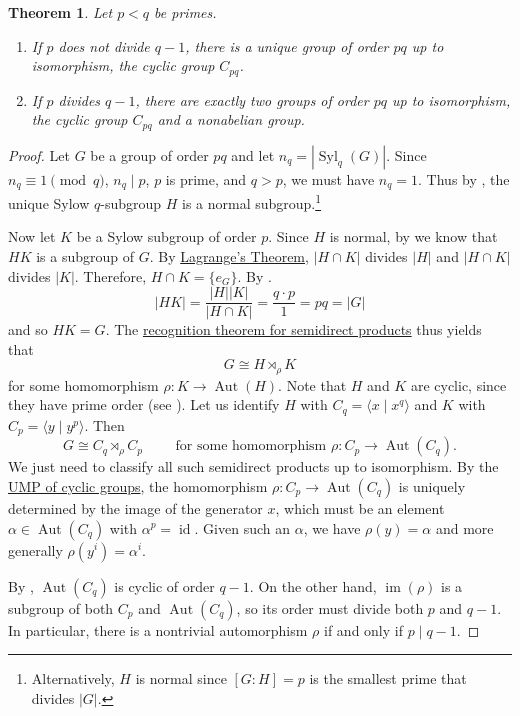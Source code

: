\documentclass[12pt]{report}
\newtheorem{theorem}{Theorem}[chapter]
\numberwithin{equation}{section}
\numberwithin{theorem}{chapter}
\theoremstyle{definition}
\newtheorem*{basic properties}{Basic Properties}
\newtheorem*{Important Remark}{Important Remark}
\def\sdp{\rtimes}
\DeclareMathOperator{\im}{im}
\DeclareMathOperator{\id}{id}
\DeclareMathOperator{\Aut}{Aut}
\DeclareMathOperator{\Syl}{Syl}
\begin{document}
\begin{theorem}
Let $p<q$ be primes.
\begin{enumerate}[itemsep=-0.1em,leftmargin=20pt]
\item If $p$ does not divide $q-1$, there is a unique group of order $pq$ up to isomorphism, the cyclic group $C_{pq}$.
\item If $p$ divides $q-1$, there are exactly two groups of order $pq$ up to isomorphism, the cyclic group $C_{pq}$ and a nonabelian group.
\end{enumerate}
\end{theorem}


\begin{proof}
Let $G$ be a group of order $pq$ and let $n_q = |\Syl_q(G)|$. Since $n_q \equiv 1 \pmod{q}$, $n_q \mid p$, $p$ is prime, and $q > p$, we must have $n_q = 1$. Thus by , the unique Sylow $q$-subgroup $H$ is a normal subgroup.\footnote{Alternatively, $H$ is normal since $[G:H]=p$ is the smallest prime that divides $|G|$.}


Now let $K$ be a Sylow subgroup of order $p$.
Since $H$ is normal, by  we know that $HK$ is a subgroup of $G$.
By \hyperref[Lagrange]{Lagrange's Theorem}, $|H\cap K|$ divides $|H|$ and $|H\cap K|$ divides $|K|$. Therefore, $H\cap K=\{e_G\}$. By .
$$|HK| = \frac{|H||K|}{|H\cap K|} = \frac{q\cdot p}{1} = pq = |G|$$
and so $HK=G$. The \hyperref[semidirect product recognition]{recognition theorem for semidirect products} thus yields that 
$$G \cong H \sdp_\rho K $$
for some homomorphism $\rho\!: K \longrightarrow \Aut(H)$. Note that $H$ and $K$ are cyclic, since they have prime order (see ). Let us identify $H$ with $C_q = \langle x \mid x^q \rangle$ and $K$ with $C_p = \langle y \mid y^p \rangle$.
Then
$$G \cong C_q \sdp_\rho C_p \qquad \text{ for some homomorphism $\rho: C_p \to \Aut(C_q)$.}$$
We just need to classify all such semidirect products up to isomorphism.
By the \hyperref[UMP for cyclic groups]{UMP of cyclic groups}, the homomorphism $\rho\!: C_p \longrightarrow \Aut(C_q)$ is uniquely determined by the image of the generator $x$, which must be an element $\alpha \in \Aut(C_q)$ with $\alpha^p = \id$. Given such an $\alpha$, we have  $\rho(y) = \alpha$ and more generally $\rho(y^i) = \alpha^{i}$.

By , $\Aut(C_q)$ is cyclic of order $q-1$. On the other hand, $\im(\rho)$ is a subgroup of both $C_p$ and $\Aut(C_q)$, so its order must divide both $p$ and $q-1$. In particular, there is a nontrivial automorphism $\rho$ if and only if $p \mid q-1$. 


\end{proof}
\end{document}
